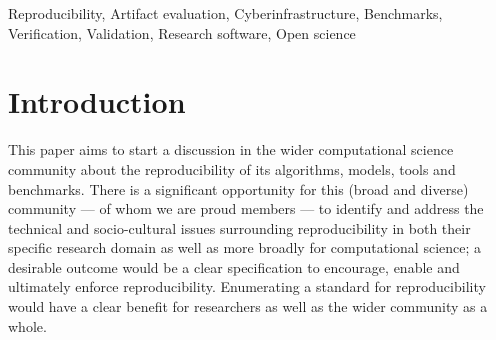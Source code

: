 \documentclass[conference]{IEEEtran}
\begin{document}
%

\begin{IEEEkeywords}
Reproducibility, Artifact evaluation, Cyberinfrastructure, Benchmarks, 
Verification, Validation, Research software, Open science
\end{IEEEkeywords}


\section{Introduction}

This paper aims to start a discussion in the wider computational
science community about the reproducibility of its algorithms, models,
tools and benchmarks. There is a significant opportunity for this
(broad and diverse) community --- of whom we are proud members --- to
identify and address the technical and socio-cultural issues
surrounding reproducibility in both their specific research domain as
well as more broadly for computational science; a desirable outcome
would be a clear specification to encourage, enable and ultimately
enforce reproducibility. Enumerating a standard for reproducibility
would have a clear benefit for researchers as well as the wider
community as a whole.
\end{document}

